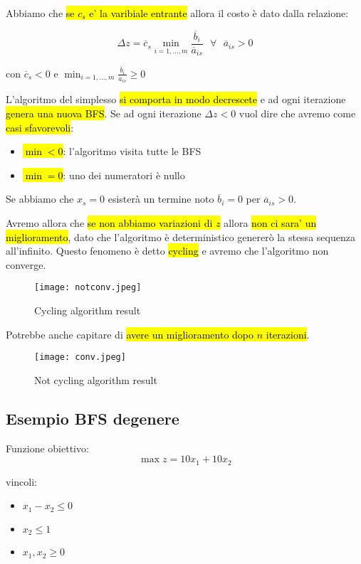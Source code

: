 Abbiamo che \hl{se $c_s$ e' la varibiale entrante} allora il costo è dato dalla relazione:

$$\Delta z = \overline{c}_s \min_{i = 1, ..., m}\frac{\overline{b}_i}{\overline{a}_{is}}\ \ \ \forall\ \ \ \overline{a}_{is} > 0$$

con $\overline{c}_s < 0$ e $\min_{i = 1, ..., m}\frac{\overline{b}_i}{\overline{a}_{is}} \geq 0$


L'algoritmo del simplesso \hl{si comporta in modo decrescete} e ad ogni iterazione \hl{genera una nuova BFS}. Se ad ogni iterazione $\Delta z < 0$ vuol dire che avremo come \hl{casi sfavorevoli}:

\begin{itemize}
	\item \hl{$\min < 0$}: l'algoritmo visita tutte le BFS
	\item \hl{$\min = 0$}: uno dei numeratori è nullo
\end{itemize}

Se abbiamo che $x_s = 0$ esisterà un termine noto $\overline{b}_i = 0$ per $\overline{a}_{is} > 0$.

Avremo allora che \hl{se non abbiamo variazioni di $z$} allora \hl{non ci sara' un miglioramento}, dato che l'algoritmo è deterministico genererò la stessa sequenza all'infinito. Questo fenomeno è detto \hl{cycling} e avremo che l'algoritmo non converge.


\begin{figure}[H]
\centering
\texttt{[image: notconv.jpeg]}
\caption{Cycling algorithm result} 
\label{notconv}
\end{figure}
	

Potrebbe anche capitare di \hl{avere un miglioramento dopo $n$ iterazioni}.


\begin{figure}[H]
\centering
\texttt{[image: conv.jpeg]}
\caption{Not cycling algorithm result} 
\label{conv}
\end{figure}
		
	
\subsection{Esempio BFS degenere}

Funzione obiettivo:
$$\max z = 10x_1 + 10x_2$$

vincoli:

\begin{itemize}
	\item $x_1 - x_2 \leq 0$
	\item $x_2 \leq 1$
	\item $x_1, x_2 \geq 0$
\end{itemize}

